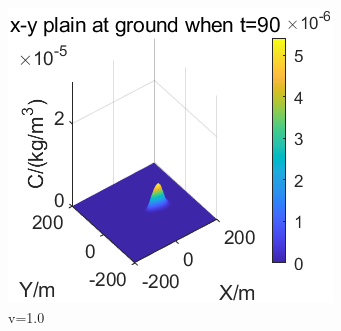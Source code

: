 \documentclass{article}
\begin{document}
\begin{figure}[htbp]
		\begin{minipage}{0.33\textwidth}
			\includegraphics[width=\textwidth]{pics/v=1,t=90.png}
		\end{minipage}
		\caption{v=1.0}
		\label{fig16}
	\end{figure}
	
\end{document}
